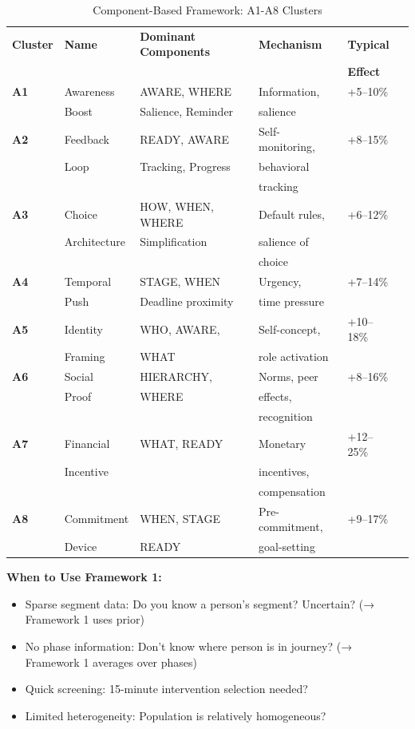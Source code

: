 \begin{table}[htbp]
\centering
\caption{Component-Based Framework: A1-A8 Clusters}
\label{tab:20-f1-clusters}
\renewcommand{\arraystretch}{1.3}
\footnotesize
\begin{tabular}{@{}llp{6cm}lll@{}}
\toprule
\textbf{Cluster} & \textbf{Name} & \textbf{Dominant Components} & \textbf{Mechanism} & \textbf{Typical} \\
& & & & \textbf{Effect} \\
\midrule
\textbf{A1} & Awareness & AWARE, WHERE & Information, & +5--10\% \\
& Boost & Salience, Reminder & salience & \\
\midrule
\textbf{A2} & Feedback & READY, AWARE & Self-monitoring, & +8--15\% \\
& Loop & Tracking, Progress & behavioral & \\
& & & tracking & \\
\midrule
\textbf{A3} & Choice & HOW, WHEN, WHERE & Default rules, & +6--12\% \\
& Architecture & Simplification & salience of & \\
& & & choice & \\
\midrule
\textbf{A4} & Temporal & STAGE, WHEN & Urgency, & +7--14\% \\
& Push & Deadline proximity & time pressure & \\
\midrule
\textbf{A5} & Identity & WHO, AWARE, & Self-concept, & +10--18\% \\
& Framing & WHAT & role activation & \\
\midrule
\textbf{A6} & Social & HIERARCHY, & Norms, peer & +8--16\% \\
& Proof & WHERE & effects, & \\
& & & recognition & \\
\midrule
\textbf{A7} & Financial & WHAT, READY & Monetary & +12--25\% \\
& Incentive & & incentives, & \\
& & & compensation & \\
\midrule
\textbf{A8} & Commitment & WHEN, STAGE & Pre-commitment, & +9--17\% \\
& Device & READY & goal-setting & \\
\bottomrule
\end{tabular}
\end{table}

\textbf{When to Use Framework 1:}
\begin{itemize}[nosep]
\item Sparse segment data: Do you know a person's segment? Uncertain? (→ Framework 1 uses prior)
\item No phase information: Don't know where person is in journey? (→ Framework 1 averages over phases)
\item Quick screening: 15-minute intervention selection needed?
\item Limited heterogeneity: Population is relatively homogeneous?
\end{itemize}

